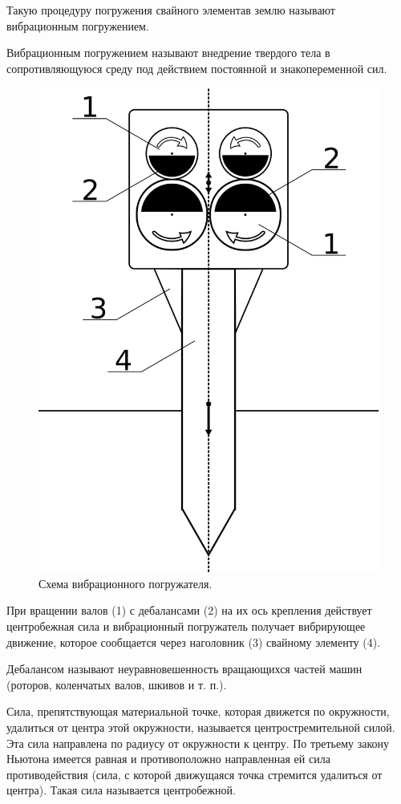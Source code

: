 Такую процедуру погружения свайного элементав землю называют вибрационным погружением.

\begin{definition}
    Вибрационным погружением называют внедрение твердого тела в сопротивляющуюся среду под действием постоянной и знакопеременной сил.
\end{definition}

\begin{figure}[h]
    \centering
    \includegraphics[width=0.5\linewidth]{img/scheme_porg_2.png}
    \caption{Схема вибрационного погружателя.}
    \label{fig:scheme_porg}
\end{figure}

При вращении валов (1) с дебалансами (2) на их ось крепления действует центробежная сила и вибрационный погружатель получает вибрирующее движение,
которое сообщается через наголовник (3) свайному элементу (4).

\begin{definition}
    Дебалансом называют неуравновешенность вращающихся частей машин (роторов, коленчатых валов, шкивов и т. п.).
\end{definition}

\begin{definition}
    Сила, препятствующая материальной точке, которая движется по окружности, удалиться от центра этой окружности,
    называется центростремительной силой. Эта сила направлена по радиусу от окружности к центру.
    По третьему закону Ньютона имеется равная и противоположно направленная ей сила противодействия
    (сила, с которой движущаяся точка стремится удалиться от центра). Такая сила называется центробежной.
\end{definition}

